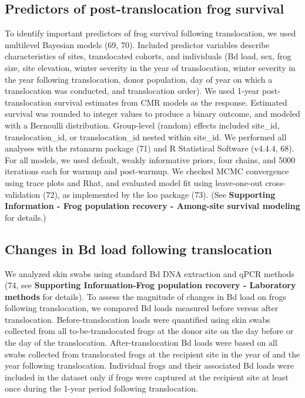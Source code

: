 \documentclass[9pt,twocolumn,twoside,lineno]{pnas-new}
\begin{document}
{\hypertarget{predictors-of-post-translocation-frog-survival}{%
\subsection*{Predictors of post-translocation frog
survival}\label{predictors-of-post-translocation-frog-survival}}

To identify important predictors of frog survival following
translocation, we used multilevel Bayesian models (69, 70). Included
predictor variables describe characteristics of sites, translocated
cohorts, and individuals (Bd load, sex, frog size, site elevation,
winter severity in the year of translocation, winter severity in the
year following translocation, donor population, day of year on which a
translocation was conducted, and translocation order). We used 1-year
post-translocation survival estimates from CMR models as the response.
Estimated survival was rounded to integer values to produce a binary
outcome, and modeled with a Bernoulli distribution. Group-level (random)
effects included site\_id, translocation\_id, or translocation\_id
nested within site\_id. We performed all analyses with the rstanarm
package (71) and R Statistical Software (v4.4.4, 68). For all models, we
used default, weakly informative priors, four chains, and 5000
iterations each for warmup and post-warmup. We checked MCMC convergence
using trace plots and Rhat, and evaluated model fit using leave-one-out
cross-validation (72), as implemented by the loo package (73). (See
\textbf{Supporting Information - Frog population recovery - Among-site
survival modeling} for details.)

\hypertarget{changes-in-bd-load-following-translocation}{%
\subsection*{Changes in Bd load following
translocation}\label{changes-in-bd-load-following-translocation}}

We analyzed skin swabs using standard Bd DNA extraction and qPCR methods
(74, see \textbf{Supporting Information-Frog population recovery -
Laboratory methods} for details). To assess the magnitude of changes in
Bd load on frogs following translocation, we compared Bd loads measured
before versus after translocation. Before-translocation loads were
quantified using skin swabs collected from all to-be-translocated frogs
at the donor site on the day before or the day of the translocation.
After-translocation Bd loads were based on all swabs collected from
translocated frogs at the recipient site in the year of and the year
following translocation. Individual frogs and their associated Bd loads
were included in the dataset only if frogs were captured at the
recipient site at least once during the 1-year period following
translocation.

}
\end{document}
